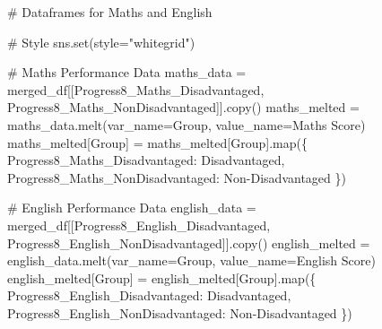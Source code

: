 \documentclass[
  letterpaper,
  DIV=11,
  numbers=noendperiod]{scrartcl}
\newenvironment{Shaded}{\begin{snugshade}}{\end{snugshade}}
\newcommand{\BuiltInTok}[1]{\textcolor[rgb]{0.00,0.23,0.31}{#1}}
\newcommand{\CommentTok}[1]{\textcolor[rgb]{0.37,0.37,0.37}{#1}}
\newcommand{\NormalTok}[1]{\textcolor[rgb]{0.00,0.23,0.31}{#1}}
\newcommand{\OperatorTok}[1]{\textcolor[rgb]{0.37,0.37,0.37}{#1}}
\newcommand{\StringTok}[1]{\textcolor[rgb]{0.13,0.47,0.30}{#1}}
\begin{document}
\begin{Shaded}
\begin{Highlighting}[]
\CommentTok{\# Dataframes for Maths and English}

\CommentTok{\# Style}
\NormalTok{sns.}\BuiltInTok{set}\NormalTok{(style}\OperatorTok{=}\StringTok{"whitegrid"}\NormalTok{)}

\CommentTok{\# Maths Performance Data}
\NormalTok{maths\_data }\OperatorTok{=}\NormalTok{ merged\_df[[}\StringTok{\textquotesingle{}Progress8\_Maths\_Disadvantaged\textquotesingle{}}\NormalTok{, }\StringTok{\textquotesingle{}Progress8\_Maths\_NonDisadvantaged\textquotesingle{}}\NormalTok{]].copy()}
\NormalTok{maths\_melted }\OperatorTok{=}\NormalTok{ maths\_data.melt(var\_name}\OperatorTok{=}\StringTok{\textquotesingle{}Group\textquotesingle{}}\NormalTok{, value\_name}\OperatorTok{=}\StringTok{\textquotesingle{}Maths Score\textquotesingle{}}\NormalTok{)}
\NormalTok{maths\_melted[}\StringTok{\textquotesingle{}Group\textquotesingle{}}\NormalTok{] }\OperatorTok{=}\NormalTok{ maths\_melted[}\StringTok{\textquotesingle{}Group\textquotesingle{}}\NormalTok{].}\BuiltInTok{map}\NormalTok{(\{}
    \StringTok{\textquotesingle{}Progress8\_Maths\_Disadvantaged\textquotesingle{}}\NormalTok{: }\StringTok{\textquotesingle{}Disadvantaged\textquotesingle{}}\NormalTok{,}
    \StringTok{\textquotesingle{}Progress8\_Maths\_NonDisadvantaged\textquotesingle{}}\NormalTok{: }\StringTok{\textquotesingle{}Non{-}Disadvantaged\textquotesingle{}}
\NormalTok{\})}

\CommentTok{\# English Performance Data}
\NormalTok{english\_data }\OperatorTok{=}\NormalTok{ merged\_df[[}\StringTok{\textquotesingle{}Progress8\_English\_Disadvantaged\textquotesingle{}}\NormalTok{, }\StringTok{\textquotesingle{}Progress8\_English\_NonDisadvantaged\textquotesingle{}}\NormalTok{]].copy()}
\NormalTok{english\_melted }\OperatorTok{=}\NormalTok{ english\_data.melt(var\_name}\OperatorTok{=}\StringTok{\textquotesingle{}Group\textquotesingle{}}\NormalTok{, value\_name}\OperatorTok{=}\StringTok{\textquotesingle{}English Score\textquotesingle{}}\NormalTok{)}
\NormalTok{english\_melted[}\StringTok{\textquotesingle{}Group\textquotesingle{}}\NormalTok{] }\OperatorTok{=}\NormalTok{ english\_melted[}\StringTok{\textquotesingle{}Group\textquotesingle{}}\NormalTok{].}\BuiltInTok{map}\NormalTok{(\{}
    \StringTok{\textquotesingle{}Progress8\_English\_Disadvantaged\textquotesingle{}}\NormalTok{: }\StringTok{\textquotesingle{}Disadvantaged\textquotesingle{}}\NormalTok{,}
    \StringTok{\textquotesingle{}Progress8\_English\_NonDisadvantaged\textquotesingle{}}\NormalTok{: }\StringTok{\textquotesingle{}Non{-}Disadvantaged\textquotesingle{}}
\NormalTok{\})}



\end{Highlighting}
\end{Shaded}
\end{document}
